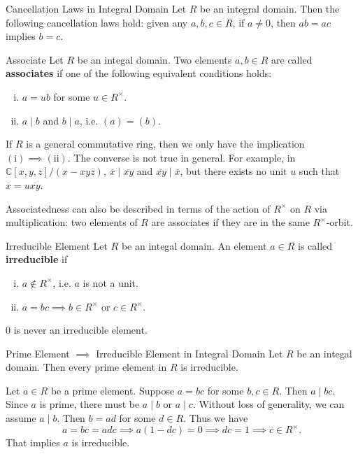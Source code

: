 \begin{proposition}{Cancellation Laws in Integral Domain}{}
    Let $R$ be an integral domain. Then the following cancellation laws hold: given any $a,b,c\in R$, if $a \ne 0$, then $ab = ac$ implies $b = c$.
\end{proposition}

\begin{definition}{Associate}{}
    Let $R$ be an integal domain. Two elements $a,b\in R$ are called \textbf{associates} if one of the following equivalent conditions holds:
    \begin{enumerate}[(i)]
        \item $a=ub$ for some $u\in R^\times$.
        \item $a\mid b$ and $b\mid a$, i.e. $(a)=(b)$.
    \end{enumerate}
\end{definition}

If $R$ is a general commutative ring, then we only have the implication $(\mathrm i)\implies (\mathrm{ii})$. The converse is not true in general. For example, in $\mathbb{C}[x,y,z]/(x-xyz)$, $\overline{x}\mid \overline{xy}$ and $\overline{xy}\mid \overline{x}$, but there exists no unit $u$ such that $\overline{x}=u\overline{xy}$.

Associatedness can also be described in terms of the action of $R^\times$ on $R$ via multiplication: two elements of $R$ are associates if they are in the same $R^\times$-orbit.
\begin{definition}{Irreducible Element}{}
    Let $R$ be an integal domain. An element $a\in R$ is called \textbf{irreducible} if
    \begin{enumerate}[(i)]
        \item $a\notin R^\times$, i.e. $a$ is not a unit.
        \item $a=bc\implies b\in R^\times\text{ or }c\in R^\times$.
    \end{enumerate}    
\end{definition}

0 is never an irreducible element.
\begin{proposition}{Prime Element $\implies$ Irreducible Element in Integral Domain}{}
    Let $R$ be an integal domain. Then every prime element in $R$ is irreducible.
\end{proposition}

\begin{prf}
    Let $a\in R$ be a prime element. Suppose $a=bc$ for some $b,c\in R$. Then $a\mid bc$. Since $a$ is prime, there must be $a\mid b$ or $a\mid c$. Without loss of generality, we can assume $a\mid b$. Then $b=ad$ for some $d\in R$. Thus we have $$a=bc=adc\implies a(1-dc)=0\implies dc=1\implies c\in R^\times.$$ That implies $a$ is irreducible.
\end{prf}

